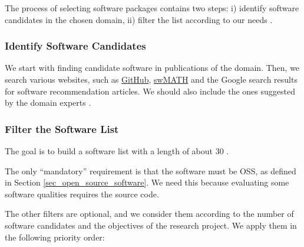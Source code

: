 \documentclass[preprint,12pt,authoryear]{elsarticle}
\begin{document}
The process of selecting software packages contains two steps: i) identify
software candidates in the chosen domain, ii) filter the list according to our
needs \citep{SmithEtAl2021}.

\subsubsection{Identify Software Candidates} \label{sec_identify_software_candidates}

We start with finding candidate software in publications of the domain. Then, we
search various websites, such as \hyperlink{https://github.com/}{GitHub},
\hyperlink{https://swmath.org/}{swMATH} and the Google search results for
software recommendation articles. We should also include the ones suggested by
the domain experts \citep{SmithEtAl2021}.

\subsubsection{Filter the Software List} \label{sec_filter_software_list}

The goal is to build a software list with a length of about 30
\citep{SmithEtAl2021}.

The only ``mandatory'' requirement is that the software must be OSS, as defined
in Section \ref{sec_open_source_software}. We need this because evaluating some
software qualities requires the source code.

The other filters are optional, and we consider them according to the number of
software candidates and the objectives of the research project. We apply them in
the following priority order:
\end{document}
